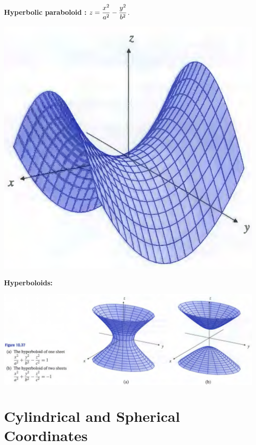 \documentclass[11pt, a4paper]{MATH2023}
\begin{document}
\begin{spacing}{1.3}
    {\bf Hyperbolic paraboloid :} $\displaystyle z=\frac{x^2}{a^2}-\frac{y^2}{b^2}$.

    \begin{center}
        \includegraphics[scale=0.3]{images/Ch10-hyperbolic-paraboloid.png}
    \end{center}

    {\bf Hyperboloids:}
    \begin{center}
        \includegraphics[scale=0.37]{images/Ch10-hyperboloid.png}
    \end{center}

    \section{Cylindrical and Spherical Coordinates}


\end{spacing}
\end{document}
